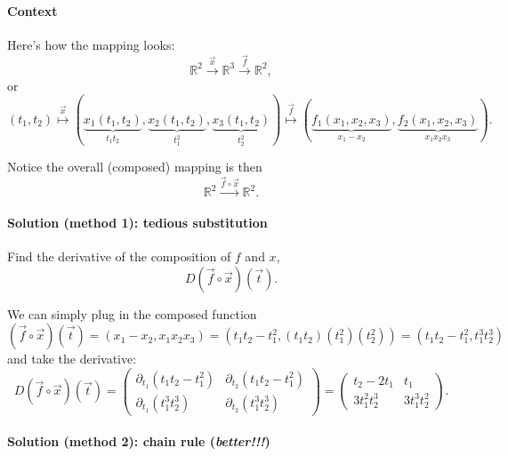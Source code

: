 \documentclass{multi}
\begin{document}
\paragraph{Context}

Here's how the mapping looks:
\[
    \mathbb R^2 \overset{\vec x}{\to} \mathbb R^3 \overset{\vec f}{\to} \mathbb R^2,
\]
or
\[
    (t_1, t_2) 
    \overset{\vec x}{\mapsto} 
    (\underbrace{x_1(t_1, t_2)}_{t_1 t_2}, 
     \underbrace{x_2(t_1, t_2)}_{t_1^2}, 
     \underbrace{x_3(t_1, t_2)}_{t_2^2})
    \overset{\vec f}{\mapsto}
    (\underbrace{f_1(x_1, x_2, x_3)}_{x_1-x_2}, 
     \underbrace{f_2(x_1, x_2, x_3)}_{x_1 x_2 x_3}).
\]

Notice the overall (composed) mapping is then
\[
    \mathbb R^2 \xrightarrow{\vec f \circ \vec x} \mathbb R^2.
\]

\paragraph{Solution (method 1): tedious substitution}

Find the derivative of the composition of \(f\) and \(x\),
\[
    D(\vec f \circ \vec x)(\vec t).
\]

We can simply plug in the composed function 
\[
    (\vec f \circ \vec x)(\vec t) = (x_1-x_2, x_1 x_2 x_3) = (t_1 t_2 - t_1^2, (t_1 t_2) (t_1^2) (t_2^2)) = (t_1 t_2 - t_1^2, t_1^3 t_2^3)
\]
and take the derivative:
\[
    D(\vec f \circ \vec x)(\vec t) = 
    \begin{pmatrix}
        \partial_{t_1} \left(t_1 t_2 - t_1^2\right) & \partial_{t_2} \left(t_1 t_2 - t_1^2\right) \\
        \partial_{t_1} \left(t_1^3 t_2^3\right) & \partial_{t_2} \left(t_1^3 t_2^3\right)
    \end{pmatrix} =
    \begin{pmatrix}
        t_2 - 2 t_1 & t_1 \\
        3 t_1^2 t_2^3 & 3 t_1^3 t_2^2
    \end{pmatrix}.
\]

\paragraph{Solution (method 2): chain rule (\emph{better!!!})}
\end{document}
